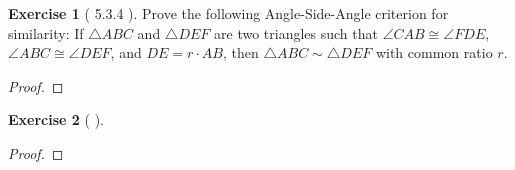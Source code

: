 \documentclass[11pt]{article}		%
\theoremstyle{definition}
\newtheorem*{exercise*}{Exercise}
\begin{document}
\begin{exercise*}[ 5.3.4   ]
	Prove the following Angle-Side-Angle criterion for similarity: If $\triangle ABC$ and $\triangle DEF$ are two triangles such that $\angle CAB \cong \angle FDE$, $\angle ABC \cong \angle DEF$, and $DE = r\cdot AB$, then $\triangle ABC \sim \triangle DEF$ with common ratio $r$.
	
\end{exercise*}

\begin{proof} 
	
\end{proof}


\vspace{1in}



\begin{exercise*}[    ]
	
	
\end{exercise*}

\begin{proof} 
	
\end{proof}


\vspace{1in}
\end{document}
